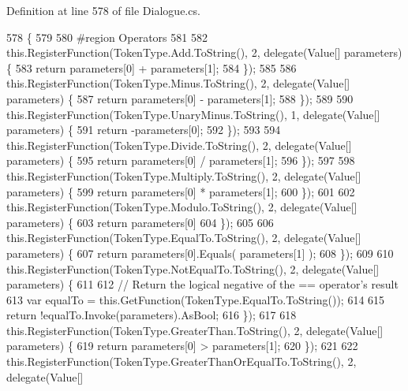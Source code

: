Definition at line 578 of file Dialogue.\-cs.


\begin{DoxyCode}
578                                      \{
579 
580 \textcolor{preprocessor}{                #region Operators}
581 \textcolor{preprocessor}{}
582                 this.RegisterFunction(TokenType.Add.ToString(), 2, delegate(Value[] parameters) \{
583                     \textcolor{keywordflow}{return} parameters[0] + parameters[1];
584                 \});
585 
586                 this.RegisterFunction(TokenType.Minus.ToString(), 2, delegate(Value[] parameters) \{
587                     \textcolor{keywordflow}{return} parameters[0] - parameters[1];
588                 \});
589 
590                 this.RegisterFunction(TokenType.UnaryMinus.ToString(), 1, delegate(Value[] parameters) \{
591                     \textcolor{keywordflow}{return} -parameters[0];
592                 \});
593 
594                 this.RegisterFunction(TokenType.Divide.ToString(), 2, delegate(Value[] parameters) \{
595                     \textcolor{keywordflow}{return} parameters[0] / parameters[1];
596                 \});
597 
598                 this.RegisterFunction(TokenType.Multiply.ToString(), 2, delegate(Value[] parameters) \{
599                     \textcolor{keywordflow}{return} parameters[0] * parameters[1];
600                 \});
601 
602                 this.RegisterFunction(TokenType.Modulo.ToString(), 2, delegate(Value[] parameters) \{
603                     \textcolor{keywordflow}{return} parameters[0] %
604                 \});
605 
606                 this.RegisterFunction(TokenType.EqualTo.ToString(), 2, delegate(Value[] parameters) \{
607                     \textcolor{keywordflow}{return} parameters[0].Equals( parameters[1] );
608                 \});
609 
610                 this.RegisterFunction(TokenType.NotEqualTo.ToString(), 2, delegate(Value[] parameters) \{
611 
612                     \textcolor{comment}{// Return the logical negative of the == operator's result}
613                     var equalTo = this.GetFunction(TokenType.EqualTo.ToString());
614 
615                     \textcolor{keywordflow}{return} !equalTo.Invoke(parameters).AsBool;
616                 \});
617 
618                 this.RegisterFunction(TokenType.GreaterThan.ToString(), 2, delegate(Value[] parameters) \{
619                     \textcolor{keywordflow}{return} parameters[0] > parameters[1];
620                 \});
621 
622                 this.RegisterFunction(TokenType.GreaterThanOrEqualTo.ToString(), 2, delegate(Value[] 

\end{DoxyCode}
